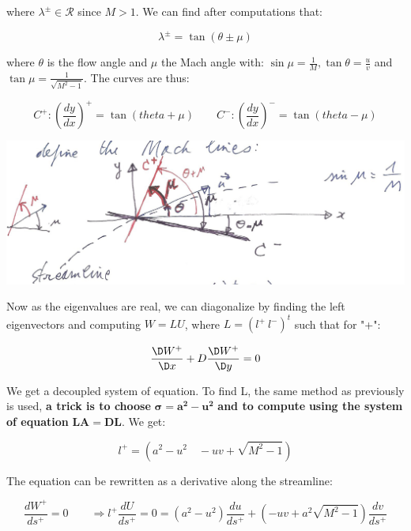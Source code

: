 \documentclass[british,french,11pt, a4paper, openany]{article}
\begin{document}
where $\lambda^\pm \in \mathcal{R}$ since $M>1$. We can find after computations that: 

\begin{equation}
\lambda ^\pm = \tan (\theta \pm \mu )
\end{equation}

where $\theta$  is the flow angle and $\mu $ the Mach angle with: $\sin \mu = \frac{1}{M}, \tan \theta = \frac{u}{v}$  and $\tan \mu = \frac{1}{\sqrt{M^2-1}}$.  The curves are thus: 

\begin{equation}
C^+: \left(\frac{dy}{dx}\right)^+ = \tan (theta + \mu) \qquad C^-: \left(\frac{dy}{dx}\right) ^- = \tan (theta - \mu )
\end{equation}

\begin{center}
	\includegraphics[scale=0.2]{ch8/18}
\end{center}

Now as the eigenvalues are real, we can diagonalize by finding the left eigenvectors and computing $W = LU$, where $L = (l^+ \ l^-)^t$ such that for "+": 

\begin{equation}
\frac{\D W^+}{\D x} + D\frac{\D W^+}{\D y} = 0
\end{equation}

We get a decoupled system of equation. To find L, the same method as previously is used, \textbf{a trick is to choose} $\bm{\sigma = a^2 - u^2}$ \textbf{and to compute} \bm{$\mu$} \textbf{using the system of equation} $\bm{LA = DL}$. We get: 

\begin{equation}
l^+ = (a^2 - u^2\quad -uv +\sqrt{M^2 -1})
\end{equation}

The equation can be rewritten as a derivative along the streamline: 

\begin{equation}
\frac{d W^+}{d s^+} =  0 \qquad \Rightarrow l^+ \frac{d U}{d s^+} = 0 = (a^2 - u^2 )\frac{d u}{d s^+} + (-uv + a^2\sqrt{M^2-1})\frac{dv}{ds^+}
\end{equation}
\end{document}
